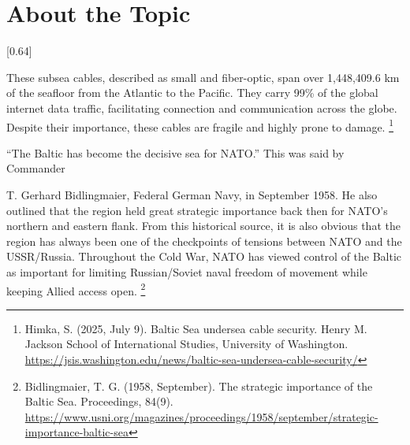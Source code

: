 \section{About the Topic}


[0.64]

These subsea cables, described as small and fiber-optic, span over 1,448,409.6 km of the seafloor from the Atlantic to the Pacific. They carry 99\% of the global internet data traffic, facilitating connection and communication across the globe. Despite their importance, these cables are fragile and highly prone to damage. \footnote{Himka, S. (2025, July 9). Baltic Sea undersea cable security. Henry M. Jackson School of International Studies, University of Washington. \url{https://jsis.washington.edu/news/baltic-sea-undersea-cable-security/}}

“The Baltic has become the decisive sea for NATO.” This was said by Commander

T. Gerhard Bidlingmaier, Federal German Navy, in September 1958. He also outlined that the region held great strategic importance back then for NATO’s northern and eastern flank. From this historical source, it is also obvious that the region has always been one of the checkpoints of tensions between NATO and the USSR/Russia. Throughout the Cold War, NATO has viewed control of the Baltic as important for limiting Russian/Soviet naval freedom of movement while keeping Allied access open. \footnote{Bidlingmaier, T. G. (1958, September). The strategic importance of the Baltic Sea. Proceedings, 84(9). \url{https://www.usni.org/magazines/proceedings/1958/september/strategic-importance-baltic-sea}}

